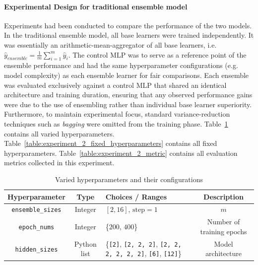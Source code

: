 \paragraph{Experimental Design for traditional ensemble model}
Experiments had been conducted to compare the performance of the two models. In the traditional ensemble model, all base learners were trained independently. It was essentially an arithmetic-mean-aggregator of all base learners, i.e. $\hat{y}_{ensemble} = \frac{1}{m} \sum_{i=1}^{m} \hat{y}_i$. The control MLP was to serve as a reference point of the ensemble performance and had the same hyperparameter configurations (e.g. model complexity) as each ensemble learner for fair comparisons. Each ensemble was evaluated exclusively against a control MLP that shared an identical architecture and training duration, ensuring that any observed performance gains were due to the use of ensembling rather than individual base learner superiority. Furthermore, to maintain experimental focus, standard variance-reduction techniques such as \textit{bagging} were omitted from the training phase. Table~\ref{table:experiment_2_varied_hyperparameters} contains all varied hyperparameters. Table~\ref{table:experiment_2_fixed_hyperparameters} contains all fixed hyperparameters. Table~\ref{table:experiment_2_metric} contains all evaluation metrics collected in this experiment. 

\begin{table}[H]
    \centering
    \begin{tabular}{|c|c|p{5cm}|c|}
        \hline
        Hyperparameter & Type & Choices / Ranges & Description \\
        \hline
        \small\texttt{ensemble\_sizes} & Integer & $[2, 16]\text{, step}=1$ & $m$ \\
        \hline
        \small\texttt{epoch\_nums} & Integer & \{$200$, $400$\} & Number of training epochs \\
        \hline
        \small\texttt{hidden\_sizes} & Python list & \{\texttt{[2]}, \texttt{[2, 2, 2]}, \texttt{[2, 2, 2, 2, 2, 2]}, \texttt{[6]}, \texttt{[12]}\} & Model architecture \\
        \hline
    \end{tabular}
    \caption{Varied hyperparameters and their configurations}
    \label{table:experiment_2_varied_hyperparameters}
\end{table}

